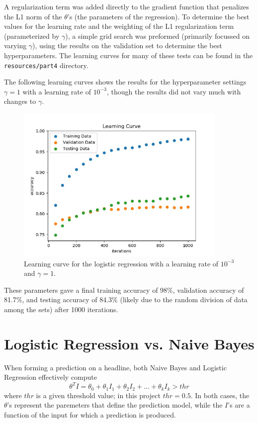\documentclass{article}
\begin{document}
   A regularization term was added directly to the gradient function that penalizes the L1 norm of the
   $\theta$'s (the parameters of the regression).
   To determine the best values for the learning rate and the weighting of the L1 regularization term (parameterized
   by $\gamma$), a simple grid search was preformed (primarily focussed on varying $\gamma$), using the results on
   the validation set to determine the best hyperparameters. The learning curves for many of these tests can be
   found in the \texttt{resources/part4} directory.

   The following learning curves shows the results for the hyperparameter settings $\gamma = 1$ with a learning
   rate of $10^{-3}$, though the results did not vary much with changes to $\gamma$.
   \begin{figure}[h] \centering
      \includegraphics[width=4in]{resources/part4}
      \caption{ Learning curve for the logistic regression with a learning rate of $10^{-3}$ and
            $\gamma = 1$.}
   \end{figure}

   These parameters gave a final training accuracy of 98\%, validation accuracy of 81.7\%, and testing
   accuracy of 84.3\% (likely due to the random division of data among the sets) after 1000 iterations.



   \section{Logistic Regression vs. Naive Bayes}
   When forming a prediction on a headline, both Naive Bayes and Logistic Regression effectively compute
   \begin{equation*}
      \theta^T I = \theta_0 + \theta_1 I_1 + \theta_2 I_2 + ... + \theta_k I_k > thr
   \end{equation*}
   where $thr$ is a given threshold value; in this project $thr = 0.5$. In both cases, the $\theta$'s represent
   the paremeters that define the prediction model, while the $I$'s are a function of the input for which a
   prediction is produced.
\end{document}
